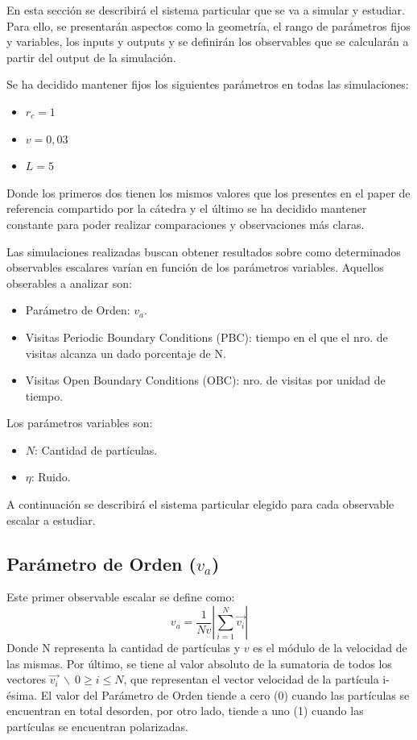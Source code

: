 \documentclass[11pt, a4paper]{article}
\begin{document}
        En esta sección se describirá el sistema particular que se va a simular y estudiar. Para ello, se
        presentarán aspectos como la geometría, el rango de parámetros fijos y variables, los inputs y outputs
        y se definirán los observables que se calcularán a partir del output de la simulación.

        Se ha decidido mantener fijos los siguientes parámetros en todas las simulaciones:
        \begin{itemize}
            \item $r_c = 1$
            \item $v = 0,03$
            \item $L = 5$
        \end{itemize}
        Donde los primeros dos tienen los mismos valores que los presentes en el paper de referencia
        compartido por la cátedra y el último se ha decidido mantener constante para poder realizar comparaciones
        y observaciones más claras.

        Las simulaciones realizadas buscan obtener resultados sobre como determinados observables escalares varían
        en función de los parámetros variables. Aquellos obserables a analizar son:
        \begin{itemize}
            \item Parámetro de Orden: $v_a$.
            \item Visitas Periodic Boundary Conditions (PBC): tiempo en el que el nro. de visitas alcanza un dado porcentaje de N.
            \item Visitas Open Boundary Conditions (OBC): nro. de visitas por unidad de tiempo.
        \end{itemize}
        Los parámetros variables son:
        \begin{itemize}
            \item $N$: Cantidad de partículas.
            \item $\eta$: Ruido.
        \end{itemize}

        A continuación se describirá el sistema particular elegido para cada observable escalar a estudiar.

        \subsection{Parámetro de Orden ($v_a$)}
            Este primer observable escalar se define como:
            \begin{equation}
                v_a = \frac{1}{Nv} \left|\sum_{i=1}^{N} \vec{v_i} \right|
            \end{equation}
            Donde N representa la cantidad de partículas y $v$ es el módulo de la velocidad de las mismas. Por último,
            se tiene al valor absoluto de la sumatoria de todos los vectores $\vec{v_i} \  \backslash \  0 \geq i \leq N$,
            que representan el vector velocidad de la partícula i-ésima. El valor del Parámetro de Orden tiende a cero
            (0) cuando las partículas se encuentran en total desorden, por otro lado, tiende a uno (1) cuando las partículas
            se encuentran polarizadas.
\end{document}
